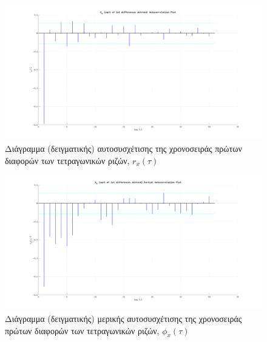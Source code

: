 \begin{figure}[H]
    \begin{center}
        \includegraphics[width=\textwidth]{assets/images/plots/xa_sqrt_of_1st_differences_autocorrelation.svg.pdf}
        \caption{Διάγραμμα (δειγματικής) αυτοσυσχέτισης της χρονοσειράς πρώτων διαφορών των τετραγωνικών ριζών, $r_x(\tau)$}
        \label{fig:xa_sqrt_of_1st_differences_autocorrelation}
    \end{center}
\end{figure}

\begin{figure}[H]
    \begin{center}
        \includegraphics[width=\textwidth]{assets/images/plots/xb_sqrt_of_1st_differences_partial_autocorrelation.svg.pdf}
        \caption{Διάγραμμα (δειγματικής) μερικής αυτοσυσχέτισης της χρονοσειράς πρώτων διαφορών των τετραγωνικών ριζών, $\phi_x(\tau)$}
        \label{fig:xb_sqrt_of_1st_differences_partial_autocorrelation}
    \end{center}
\end{figure}